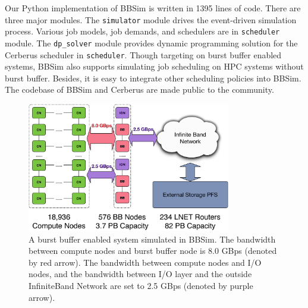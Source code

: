 Our Python implementation of BBSim is written in 1395 lines of code.
There are three major modules.
The \texttt{simulator} module drives the event-driven simulation process.
Various job models, job demands, and schedulers are in \texttt{scheduler} module.
The \texttt{dp\_solver} module provides dynamic programming solution for
the Cerberus scheduler in \texttt{scheduler}.
Though targeting on burst buffer enabled systems,
BBSim also supports simulating job scheduling on HPC systems without burst buffer.
Besides, it is easy to integrate other scheduling policies into BBSim.
The codebase of BBSim and Cerberus are made public to the community\cite{bbsim-github}.

\begin{figure}[htp]
        \centering
        \includegraphics[width=3.5in]{BBArchitecturewithBandwidth}
        \caption{A burst buffer enabled system simulated in BBSim. The bandwidth between compute nodes and burst buffer node is 8.0 GBps (denoted by red arrow). The bandwidth between compute nodes and I/O nodes, and the bandwidth between I/O layer and the outside InfiniteBand Network are set to 2.5 GBps (denoted by purple arrow).}
\label{Fig:BBArchitecture}
\end{figure}

